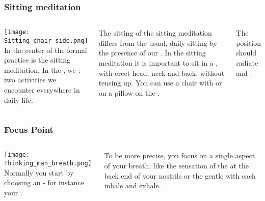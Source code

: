 \begin{frame}
\frametitle{Sitting meditation}
\begin{columns}[c] %

\texttt{[image: Sitting\_chair\_side.png]}
In the center of the formal practice is the sitting meditation. In the , we : two activities we encounter everywhere in daily life. 

The sitting of the sitting meditation differs from the usual, daily sitting by the presence of our . 
In the sitting meditation it is important to sit in a , with erect head, neck and back, without tensing up. 
You can use a chair with  or on a pillow on the . 

The position should radiate and .
\end{columns}
\end{frame}

\begin{frame}
\frametitle{Focus Point}
\begin{columns}[c] %

\texttt{[image: Thinking\_man\_breath.png]}
Normally you start by choosing an  - for instance your . 

To be more precise, you focus on a single aspect of your breath, like the sensation of the  at the back end of your nostrils or the gentle  with each inhale and exhale. 
\end{columns}
\end{frame}

